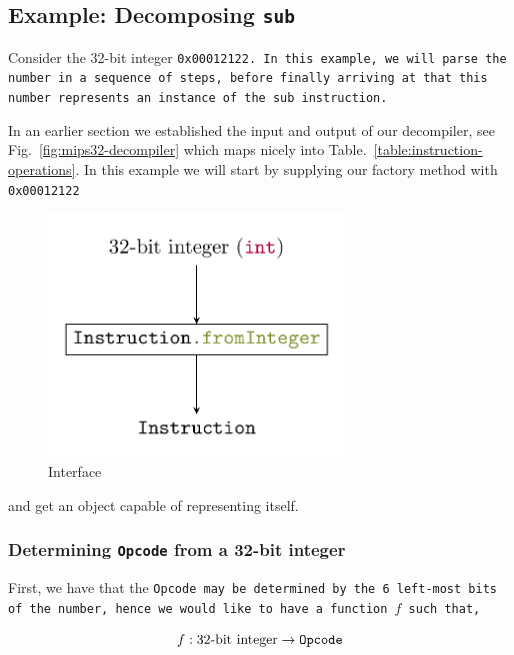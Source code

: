 \subsection{Example: Decomposing \texttt{sub}}

Consider the 32-bit integer \tt{0x00012122}. In this example, we will
parse the number in a sequence of steps, before finally arriving at
that this number represents an instance of the \tt{sub} instruction.

In an earlier section we established the input and output of our
decompiler, see Fig.~\eqref{fig:mips32-decompiler} which maps nicely
into Table.~\ref{table:instruction-operations}. In this example we
will start by supplying our factory
method  with
\tt{0x00012122}

\begin{figure}[H]
  \centering 
  \includegraphics[width=0.7\textwidth]{figures/mips32-decompiler-interface.png} 
  \caption{Interface} \label{fig:mips32-decompiler-interface}
\end{figure}

and get an object  capable of representing itself.

\subsubsection{Determining \texttt{Opcode} from a 32-bit integer}
First, we have that the \tt{Opcode} may be determined by the 6
left-most bits of the number, hence we would like to have a function
$f$ such that,

\begin{equation*}
f: \textrm{32-bit integer} \to \tt{Opcode}
\end{equation*}

